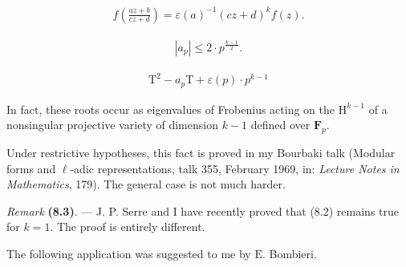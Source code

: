 \documentclass[10pt,leqno]{article}
\begin{document}
\begin{equation*}\begin{gathered}f\left(\frac{az+b}{cz+d}\right) = \varepsilon (a)^{-1}(cz+d)^{k} f(z).\end{gathered}\end{equation*}

\par

\begin{equation*}\begin{gathered}|a_{p}| \leq  2\cdot p^{\frac{k-1}{2}}.\end{gathered}\end{equation*}

\par

\begin{equation*}\begin{gathered}\mathrm{T}^{2} - a_{p} \mathrm{T} + \varepsilon (p)\cdot p^{k-1}\end{gathered}\end{equation*}

\par

\noindent In fact, these roots occur as eigenvalues of Frobenius acting on the \(\mathrm{H}^{k-1}\) of a nonsingular projective variety of dimension \(k-1\) defined over \(\mathbf{F}_{p}\).\par

\noindent Under restrictive hypotheses, this fact is proved in my Bourbaki talk (Modular forms and \(\ell \)-adic representations, talk 355, February 1969, in: \emph{Lecture Notes in Mathematics}, 179). The general case is not much harder.\par

\noindent \emph{Remark} \textbf{(8.3)}. — J. P. Serre and I have recently proved that (8.2) remains true for \(k = 1\). The proof is entirely different.\par

\noindent The following application was suggested to me by \(\mathrm{E}\). Bombieri.\par
\end{document}
